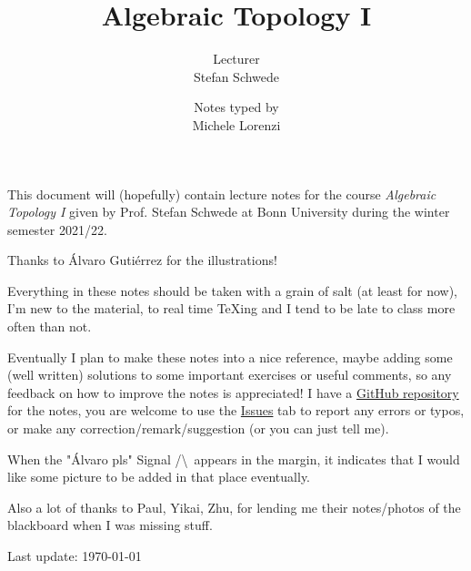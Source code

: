 \documentclass[a4paper, 10pt, oneside, DIV=9, chapterprefix=true, numbers=enddot,bibliography=totoc]{scrbook}
\title{Algebraic Topology I}
\author{{\normalsize Lecturer}\\
	Stefan Schwede}
\date{{\normalsize Notes typed by}\\
	Michele Lorenzi}
\begin{document}
\setlength{\parindent}{0pt}
\setlength{\parskip}{4pt}

\frontmatter
{}
\renewcommand{\thedummy}{\arabic{dummy}}
\maketitle
This document will (hopefully) contain lecture notes for the course \emph{Algebraic Topology I} given by Prof. Stefan Schwede at Bonn University during the winter semester 2021/22.

Thanks to \'Alvaro Guti\'errez for the illustrations!

Everything in these notes should be taken with a grain of salt (at least for now), I'm new to the material, to real time \TeX ing and I tend to be late to class more often than not.

Eventually I plan to make these notes into a nice reference, maybe adding some (well written) solutions to some important exercises or useful comments, so any feedback on how to improve the notes is appreciated! I have a \href{https://github.com/lrnmhl/AT1}{GitHub repository} for the notes, you are welcome to use the \href{https://github.com/lrnmhl/AT1/issues}{Issues} tab to report any errors or typos, or make any correction/remark/suggestion (or you can just tell me).

When the "\'Alvaro pls" Signal /\textbackslash\ appears in the margin, it indicates that I would like some picture to be added in that place eventually.

Also a lot of thanks to Paul, Yikai, Zhu, for lending me their notes/photos of the blackboard when I was missing stuff.

\hrulefill

Last update: \today
	
	
	
\tableofcontents
{}
\setcounter{llecture}{0}
\mainmatter{}
\renewcommand{\thedummy}{\thechapter.\arabic{dummy}}
\renewcommand{\thechapter}{\arabic{chapter}}












\nocite{*}


\backmatter{}
\printbibliography[heading=bibintoc, title={References}]
\end{document}
